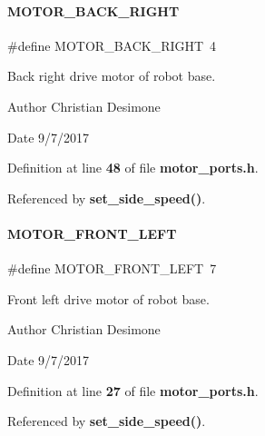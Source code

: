 \paragraph{M\+O\+T\+O\+R\+\_\+\+B\+A\+C\+K\+\_\+\+R\+I\+G\+HT}
{\footnotesize\ttfamily \#define M\+O\+T\+O\+R\+\_\+\+B\+A\+C\+K\+\_\+\+R\+I\+G\+HT~4}



Back right drive motor of robot base. 

\begin{DoxyAuthor}{Author}
Christian Desimone 
\end{DoxyAuthor}
\begin{DoxyDate}{Date}
9/7/2017 
\end{DoxyDate}


Definition at line \textbf{ 48} of file \textbf{ motor\+\_\+ports.\+h}.



Referenced by \textbf{ set\+\_\+side\+\_\+speed()}.

\mbox{\label{motor__ports_8h_a743b47e164fb23b30f4f2f228db0b338}} 
\paragraph{M\+O\+T\+O\+R\+\_\+\+F\+R\+O\+N\+T\+\_\+\+L\+E\+FT}
{\footnotesize\ttfamily \#define M\+O\+T\+O\+R\+\_\+\+F\+R\+O\+N\+T\+\_\+\+L\+E\+FT~7}



Front left drive motor of robot base. 

\begin{DoxyAuthor}{Author}
Christian Desimone 
\end{DoxyAuthor}
\begin{DoxyDate}{Date}
9/7/2017 
\end{DoxyDate}


Definition at line \textbf{ 27} of file \textbf{ motor\+\_\+ports.\+h}.



Referenced by \textbf{ set\+\_\+side\+\_\+speed()}.

\mbox{\label{motor__ports_8h_a6f48bcc6d5fce24caeae0b17954c277a}} 

